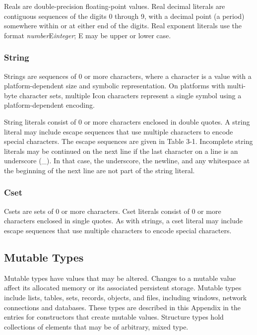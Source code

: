 Reals are double-precision floating-point values.
Real decimal literals are contiguous sequences of the digits 0 through
9, with a decimal point (a period) somewhere within or at either end of
the digits. Real exponent literals use the format
\textit{number}E\textit{integer}; E may be upper or lower case.

\subsubsection[String]{String}

Strings are sequences of 0 or more characters, where a
character is a value with a platform-dependent size and symbolic
representation. On platforms with multi-byte character sets, multiple
Icon characters represent a single symbol using a platform-dependent
encoding.

String literals consist of 0 or more characters enclosed in double
quotes. A string literal may include escape sequences that use multiple
characters to encode special characters. The escape sequences are given
in Table 3-1. Incomplete string literals may
be continued on the next line if the last character on a line is an
underscore (\_). In that case, the underscore, the newline, and any
whitespace at the beginning of the next line are not part of the string
literal.

\subsubsection[Cset]{Cset}

Csets are sets of 0 or more characters. Cset literals
consist of 0 or more characters enclosed in single quotes. As with
strings, a cset literal may include escape
sequences that use multiple characters to encode special characters.

\subsection{Mutable Types}

Mutable types have values that may be altered. Changes to a
mutable value affect its allocated memory or its
associated persistent storage. Mutable types include lists, tables,
sets, records, objects, and files, including windows, network
connections and databases. These types are described in
this Appendix in the entries for constructors that
create mutable values. Structure types hold
collections of elements that may be of arbitrary, mixed type.

